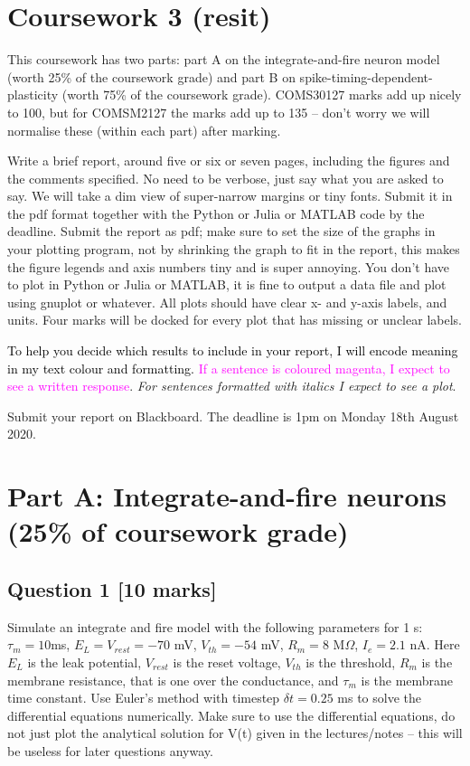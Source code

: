 \documentclass[12pt]{article}
\begin{document}
\section*{Coursework 3 (resit)}
This coursework has two parts: part A on the integrate-and-fire neuron model (worth 25\% of the coursework grade) and part B on spike-timing-dependent-plasticity (worth 75\% of the coursework grade). COMS30127 marks add up nicely to 100, but for COMSM2127 the marks add up to 135 -- don't worry we will normalise these (within each part) after marking.

Write a brief report, around five or six or seven pages,
including the figures and the comments specified. No need to be verbose, just say what you are asked to say. We will take a dim view of super-narrow margins or tiny fonts. Submit it in the pdf format
together with the Python or Julia or MATLAB code by the deadline. Submit the report as pdf; make
sure to set the size of the graphs in your plotting program, not by
shrinking the graph to fit in the report, this makes the figure
legends and axis numbers tiny and is super annoying. You don't have to
plot in Python or Julia or MATLAB, it is fine to output a data file and plot
using gnuplot or whatever. All plots should have clear x- and y-axis labels, and units. Four marks will be docked for every plot that has missing or unclear labels.

\textcolor{black}{To help you decide which results to include in your
report, I will encode meaning in my text colour and formatting. }\textcolor{magenta}{If
a sentence is coloured magenta, I expect to see a written response}.
\emph{For sentences formatted with italics I expect to see a plot}.

Submit your report on Blackboard. The deadline is 1pm on Monday 18th August 2020.

\section*{Part A: Integrate-and-fire neurons (25\% of coursework grade)}

\subsection*{Question 1 [10 marks]}

Simulate an integrate and fire model with the following parameters for
1 s: $\tau_m = 10 $ms, $E_L = V_{rest} = -70$ mV, $V_{th} = -54$ mV, $R_m= 8$
M$\Omega$, $I_e = 2.1 $ nA. Here $E_L$ is the leak potential, $V_{rest}$ is the reset voltage,
$V_{th}$ is the threshold, $R_m$ is the membrane resistance, that is one
over the conductance, and $\tau_m$ is the membrane time constant. Use Euler's method with timestep $\delta t
= 0.25$ ms to solve the differential equations numerically. Make sure to use the differential equations, do not just plot the analytical solution for V(t) given in the lectures/notes -- this will be useless for later questions anyway.
\end{document}
